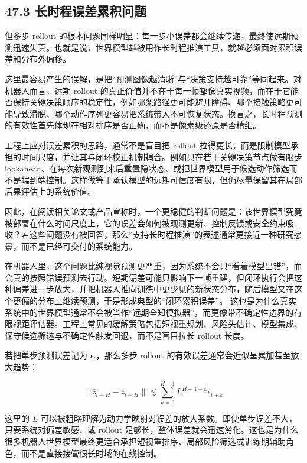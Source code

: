 \subsection*{47.3 长时程误差累积问题}


但多步 rollout 的根本问题同样明显：每一步小误差都会继续传递，最终使远期预测迅速失真。也就是说，世界模型越被用作长时程推演工具，就越必须面对累积误差和分布外偏移。

这里最容易产生的误解，是把“预测图像越清晰”与“决策支持越可靠”等同起来。对机器人而言，远期 rollout 的真正价值并不在于每一帧都像真实视频，而在于它能否保持关键决策顺序的稳定性，例如哪条路径更可能避开障碍、哪个接触策略更可能导致滑脱、哪个动作序列更容易把系统带入不可恢复状态。换言之，长时程预测的有效性首先体现在相对排序是否正确，而不是像素级还原是否精细。

工程上应对误差累积的思路，通常不是盲目把 rollout 拉得更长，而是限制模型承担的时间尺度，并让其与闭环校正机制耦合。例如只在若干关键决策节点做有限步 lookahead、在每次新观测到来后重置隐状态、或把世界模型用于候选动作筛选而不是端到端控制。这样做等于承认模型的远期可信度有限，但仍尽量保留其在局部后果评估上的系统价值。

因此，在阅读相关论文或产品宣称时，一个更稳健的判断问题是：该世界模型究竟被部署在什么时间尺度上，它的误差会如何被观测更新、控制反馈或安全约束吸收？若这些问题没有被回答，那么“支持长时程推演”的表述通常更接近一种研究愿景，而不是已经可交付的系统能力。

在机器人里，这个问题比纯视觉预测更严重，因为系统不会只“看着模型出错”，而会真的按照错误预测去行动。短期偏差可能只影响下一帧重建，但闭环执行会把这种偏差进一步放大，并把机器人推向训练中更少见的新状态分布，随后模型又在这个更偏的分布上继续预测，于是形成典型的“闭环累积误差”。 这也是为什么真实系统中的世界模型通常不会被当作“远期全知模拟器”，而更像带不确定性边界的有限视距评估器。工程上常见的缓解策略包括短视重规划、风险头估计、模型集成、保守候选筛选与不确定性触发回退，而不是盲目拉长 rollout 长度。

若把单步预测误差记为 \(\epsilon_t\)，那么多步 rollout 的有效误差通常会近似呈累加甚至放大趋势：

\begingroup
\footnotesize
\begin{equation*}
\|\hat{z}_{t+H} - z_{t+H}\| \lesssim \sum_{k=0}^{H-1} L^{H-1-k}\epsilon_{t+k}
\end{equation*}
\endgroup

这里的 \(L\) 可以被粗略理解为动力学映射对误差的放大系数。即使单步误差不大，只要系统对偏差敏感、或 rollout 足够长，整体误差就会迅速劣化。这也是为什么很多机器人世界模型最终更适合承担短视重排序、局部风险筛选或训练期辅助角色，而不是直接接管很长时域的在线控制。

